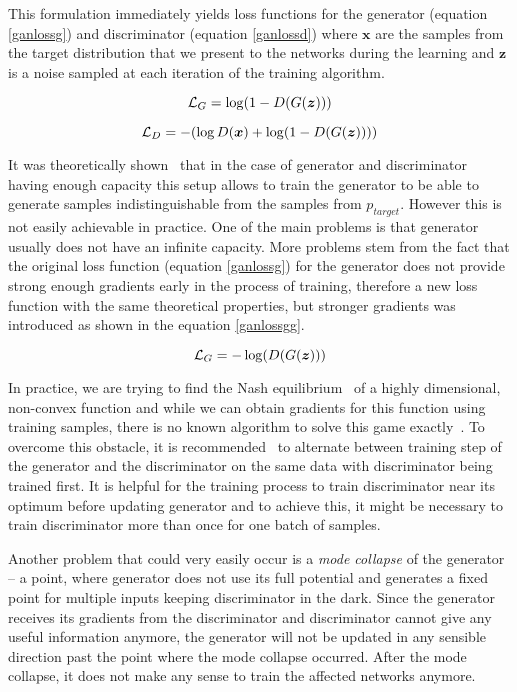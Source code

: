This formulation immediately yields loss functions for the generator (equation \ref{ganlossg}) and discriminator (equation \ref{ganlossd}) where $\bm{x}$ are the samples from the target distribution that we present to the networks during the learning and $\bm{z}$ is a noise sampled at each iteration of the training algorithm.

\begin{equation}
\mathcal{L}_G = \log(1 - D(G(\bm{z})))
\label{ganlossg}
\end{equation}

\begin{equation}
\mathcal{L}_D = - (\log D(\bm{x}) + \log(1 - D(G(\bm{z}))))
\label{ganlossd}
\end{equation}

It was theoretically shown~\cite{origgan} that in the case of generator and discriminator having enough capacity this setup allows to train the generator to be able to generate samples indistinguishable from the samples from $p_{target}$. However this is not easily achievable in practice. One of the main problems is that generator usually does not have an infinite capacity. More problems stem from the fact that the original loss function (equation \ref{ganlossg}) for the generator does not provide strong enough gradients early in the process of training, therefore a new loss function with the same theoretical properties, but stronger gradients was introduced as shown in the equation \ref{ganlossgg}.

\begin{equation}
\mathcal{L}_G = -\log(D(G(\bm{z})))
\label{ganlossgg}
\end{equation}

In practice, we are trying to find the Nash equilibrium~\cite{nash} of a highly dimensional, non-convex function and while we can obtain gradients for this function using training samples, there is no known algorithm to solve this game exactly~\cite{improvedgan}. To overcome this obstacle, it is recommended~\cite{origgan} to alternate between training step of the generator and the discriminator on the same data with discriminator being trained first. It is helpful for the training process to train discriminator near its optimum before updating generator and to achieve this, it might be necessary to train discriminator more than once for one batch of samples.

Another problem that could very easily occur is a {\em mode collapse} of the generator -- a point, where generator does not use its full potential and generates a fixed point for multiple inputs keeping discriminator in the dark. Since the generator receives its gradients from the discriminator and discriminator cannot give any useful information anymore, the generator will not be updated in any sensible direction past the point where the mode collapse occurred. After the mode collapse, it does not make any sense to train the affected networks anymore.

